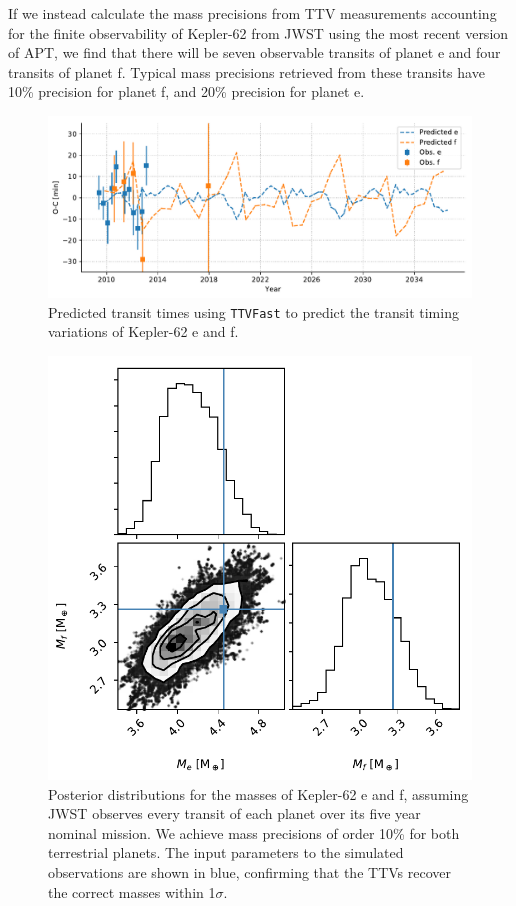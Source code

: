 If we instead calculate the mass precisions from TTV measurements accounting for the finite observability of Kepler-62 from JWST using the most recent version of APT, we find that there will be seven observable transits of planet e and four transits of planet f. Typical mass precisions retrieved from these transits have 10\% precision for planet f, and 20\% precision for planet e.  

\begin{figure}
    \centering
    \includegraphics[scale=0.8]{libra/ttvs_predicted.pdf}
    \caption{Predicted transit times using \texttt{TTVFast} to predict the transit timing variations of Kepler-62 e and f. }
    \label{fig:ttv_predicted}
\end{figure}

\begin{figure}
    \centering
    \includegraphics[scale=0.6]{libra/masses_kitchen_sink.pdf}
    \caption{Posterior distributions for the masses of Kepler-62 e and f, assuming JWST observes every transit of each planet over its five year nominal mission. We achieve mass precisions of order 10\% for both terrestrial planets. The input parameters to the simulated observations are shown in blue, confirming that the TTVs recover the correct masses within 1$\sigma$.}
    \label{fig:mass_posteriors}
\end{figure}

